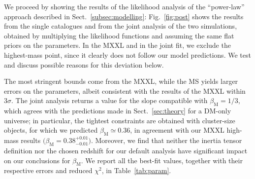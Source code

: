 \documentclass[a4paper,fleqn,usenatbib]{mnras}
\begin{document}
We proceed by showing the results of the likelihood analysis of the ``power-law'' approach described in Sect.~\ref{subsec:modelling}: 
Fig.~\ref{fig:post}\protect{} shows the results from the single catalogues and from the joint analysis of the two simulations, obtained by multiplying the likelihood functions and assuming the same flat priors on the parameters. In the MXXL and in the joint fit, we exclude the highest-mass point, since it clearly does not follow our model predictions. We test and discuss possible reasons for this deviation below.

The most stringent bounds come from the MXXL, while the MS yields larger errors on the parameters, albeit consistent with the results of the MXXL within $3\sigma$. The joint analysis returns a value for the slope compatible with $\beta_{\mathrm{M}} = 1/3$, which agrees with the predictions made in Sect.~\ref{sec:theory} for a DM-only universe; in particular, the tightest constraints are obtained with cluster-size objects, for which we predicted $\beta_{\mathrm{M}} \simeq 0.36$, in agreement with our MXXL high-mass results $\big( \beta_{\mathrm{M}} = 0.38^{+0.01}_{-0.01} \big)$. Moreover, we find that neither the inertia tensor definition nor the chosen redshift for our default analysis have significant impact on our conclusions for $\beta_{\mathrm{M}}$. %
We report all the best-fit values, together with their respective errors and reduced $\chi^2$, in Table~\ref{tab:param}.
\end{document}
